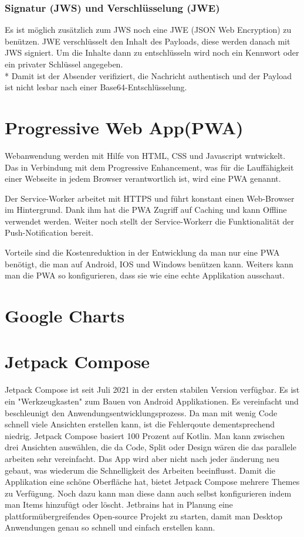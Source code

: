\subsubsection{Signatur (JWS) und Verschlüsselung (JWE)}
Es ist möglich zusätzlich zum JWS noch eine JWE (JSON Web Encryption) zu benützen. JWE verschlüsselt den Inhalt des Payloads, diese werden danach mit JWS signiert.
Um die Inhalte dann zu entschlüsseln wird noch ein Kennwort oder ein privater Schlüssel angegeben. \\*
Damit ist der Absender verifiziert, die Nachricht authentisch und der Payload ist nicht lesbar nach einer Base64-Entschlüsselung. \cite{JWTIONOS}


\section{Progressive Web App(PWA)}
Webanwendung werden mit Hilfe von HTML, CSS und Javascript wntwickelt. 
Das in Verbindung mit dem Progressive Enhancement, was für die Lauffähigkeit einer Webseite in jedem Browser verantwortlich ist, wird eine PWA genannt. 

Der Service-Worker arbeitet mit HTTPS und führt konstant einen Web-Browser im Hintergrund.
Dank ihm hat die PWA Zugriff auf Caching und kann Offline verwendet werden. 
Weiter noch stellt der Service-Workerr die Funktionalität der Push-Notification bereit.  


Vorteile sind die Kostenreduktion in der Entwicklung da man nur eine PWA benötigt, die man auf Android, IOS und Windows benützen kann.
Weiters kann man die PWA so konfigurieren, dass sie wie eine echte Applikation ausschaut.


\section{Google Charts}

\section{Jetpack Compose}
\cite{Jetpack-Compose}
\author{Bozidar Spasenovic}
Jetpack Compose ist seit Juli 2021 in der ersten stabilen Version verfügbar. Es ist ein "Werkzeugkasten" zum Bauen von Android Applikationen.
Es vereinfacht und beschleunigt den Anwendungsentwicklungsprozess. Da man mit wenig Code schnell viele Ansichten erstellen kann, ist die Fehlerqoute dementsprechend niedrig.
Jetpack Compose basiert 100 Prozent auf Kotlin. Man kann zwischen drei Ansichten auswählen, die da Code, Split oder Design wären die das parallele arbeiten sehr vereinfacht. 
Das App wird aber nicht nach jeder änderung neu gebaut, was wiederum die Schnelligkeit des Arbeiten beeinflusst. Damit die Applikation eine schöne Oberfläche hat, bietet
Jetpack Compose mehrere Themes zu Verfügung. Noch dazu kann man diese dann auch selbst konfigurieren indem man Items hinzufügt oder löscht.
Jetbrains hat in Planung eine plattformübergreifendes Open-source Projekt zu starten, damit man Desktop Anwendungen genau so schnell und einfach erstellen kann. 

